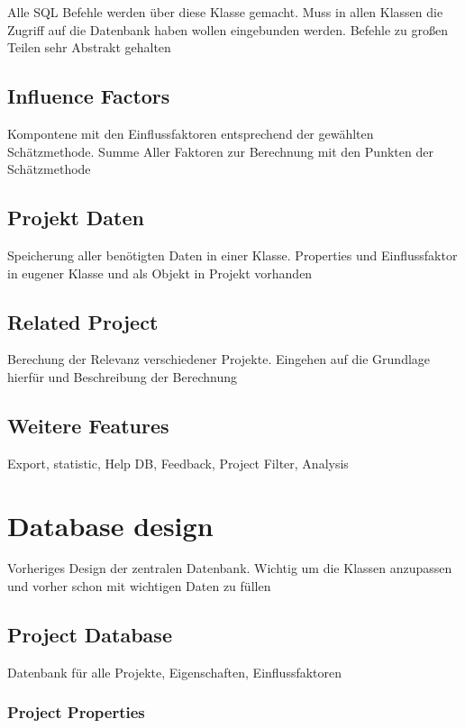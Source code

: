 Alle SQL Befehle werden über diese Klasse gemacht. Muss in allen Klassen die Zugriff auf die Datenbank haben wollen eingebunden werden. Befehle zu großen Teilen sehr Abstrakt gehalten

\subsection{Influence Factors}

Kompontene mit den Einflussfaktoren entsprechend der gewählten Schätzmethode. Summe Aller Faktoren zur Berechnung mit den Punkten der Schätzmethode

\subsection{Projekt Daten}

Speicherung aller benötigten Daten in einer Klasse. Properties und Einflussfaktor in eugener Klasse und als Objekt in Projekt vorhanden

\subsection{Related Project}

Berechung der Relevanz verschiedener Projekte. Eingehen auf die Grundlage hierfür und Beschreibung der Berechnung 

\subsection{Weitere Features}

Export, statistic, Help DB, Feedback, Project Filter, Analysis


\section{Database design}

Vorheriges Design der zentralen Datenbank. Wichtig um die Klassen anzupassen und vorher schon mit wichtigen Daten zu füllen

\subsection{Project Database}

Datenbank für alle Projekte, Eigenschaften, Einflussfaktoren

\subsubsection{Project Properties}

